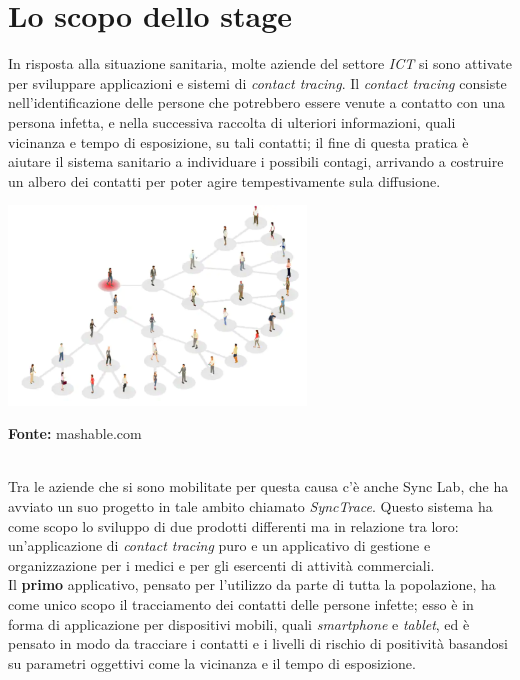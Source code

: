 
\section{Lo scopo dello stage}

In risposta alla situazione sanitaria, molte aziende del settore \textit{ICT} si sono attivate per sviluppare applicazioni e sistemi di \textit{contact tracing}. Il \textit{contact tracing} consiste nell'identificazione delle persone che potrebbero essere venute a contatto con una persona infetta, e nella successiva raccolta di ulteriori informazioni, quali vicinanza e tempo di esposizione, su tali contatti; il fine di questa pratica è aiutare il sistema sanitario a individuare i possibili contagi, arrivando a costruire un albero dei contatti per poter agire tempestivamente sula diffusione. \\

\begin{minipage}{\linewidth}
  \centering
    \includegraphics[height=5.3cm]{immagini/contacttracing}
  \caption*{\textbf{Fonte:} mashable.com}
\end{minipage} \\

Tra le aziende che si sono mobilitate per questa causa c'è anche Sync Lab, che ha avviato un suo progetto in tale ambito chiamato \textit{SyncTrace}. Questo sistema ha come scopo lo sviluppo di due prodotti differenti ma in relazione tra loro: un'applicazione di \textit{contact tracing} puro e un applicativo di gestione e organizzazione per i medici e per gli esercenti di attività commerciali. \\
Il \textbf{primo} applicativo, pensato per l'utilizzo da parte di tutta la popolazione, ha come unico scopo il tracciamento dei contatti delle persone infette; esso è in forma di applicazione per dispositivi mobili, quali \textit{smartphone} e \textit{tablet}, ed è pensato in modo da tracciare i contatti e i livelli di rischio di positività basandosi su parametri oggettivi come la vicinanza e il tempo di esposizione. \\

